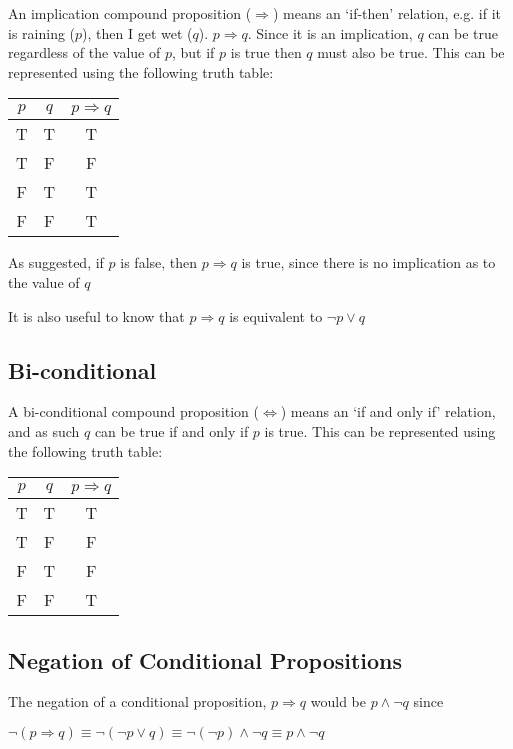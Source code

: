 An implication compound proposition ($\Rightarrow$) means an `if-then' relation, e.g. if it is raining ($p$), then I get
 wet ($q$). $p \Rightarrow q$. Since it is an implication, $q$ can be true regardless of the value of $p$, but if $p$ is
 true then $q$ must also be true. This can be represented using the following truth table:
\begin{table}[h]
  \centering
  \begin{tabular}{ c c c }
    $p$ & $q$ & $p \Rightarrow q$ \\
    \hline
    T & T & T \\
    T & F & F \\
    F & T & T \\
    F & F & T
  \end{tabular}
\end{table}

As suggested, if $p$ is false, then $p \Rightarrow q$ is true, since there is no implication as to the value of $q$

It is also useful to know that $p \Rightarrow q$ is equivalent to $\neg p \vee q$

\subsection*{Bi-conditional}

A bi-conditional compound proposition ($\Leftrightarrow$) means an `if and only if' relation, and as such $q$ can be
 true if and only if $p$ is true. This can be represented using the following truth table:
\begin{table}[h]
  \centering
  \begin{tabular}{ c c c }
    $p$ & $q$ & $p \Rightarrow q$ \\
    \hline
    T & T & T \\
    T & F & F \\
    F & T & F \\
    F & F & T
  \end{tabular}
\end{table}

\subsection*{Negation of Conditional Propositions}

The negation of a conditional proposition, $p \Rightarrow q$ would be $p \wedge \neg q$ since
\begin{center}
  $\neg (p \Rightarrow q) \equiv \neg (\neg p \vee q) \equiv \neg (\neg p) \wedge \neg q \equiv p \wedge \neg q$
\end{center}

